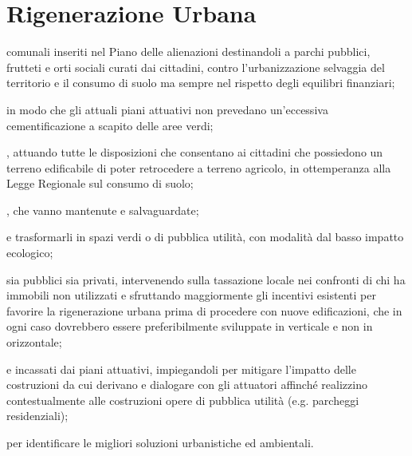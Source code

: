 \section{Rigenerazione Urbana}
 comunali inseriti nel Piano delle alienazioni destinandoli a parchi pubblici, frutteti e orti sociali curati dai cittadini, contro l'urbanizzazione selvaggia del territorio e il consumo di suolo ma sempre nel rispetto degli equilibri finanziari;

 in modo che gli attuali piani attuativi non prevedano un'eccessiva cementificazione a scapito delle aree verdi;

, attuando tutte le disposizioni che consentano ai cittadini che possiedono un terreno edificabile di poter retrocedere a terreno agricolo, in ottemperanza alla Legge Regionale sul consumo di suolo; 

, che vanno mantenute e salvaguardate;

 e trasformarli in spazi verdi o di pubblica utilità, con modalità dal basso impatto ecologico; 

 sia pubblici sia privati, intervenendo sulla tassazione locale nei confronti di chi ha immobili non utilizzati e sfruttando maggiormente gli incentivi esistenti per favorire la rigenerazione urbana prima di procedere con nuove edificazioni, che in ogni caso dovrebbero essere preferibilmente sviluppate in verticale e non in orizzontale;

e incassati dai piani attuativi, impiegandoli per mitigare l'impatto delle costruzioni da cui derivano e dialogare con gli attuatori affinché realizzino contestualmente alle costruzioni opere di pubblica utilità (e.g. parcheggi residenziali);

 per identificare le  migliori soluzioni urbanistiche ed ambientali.
